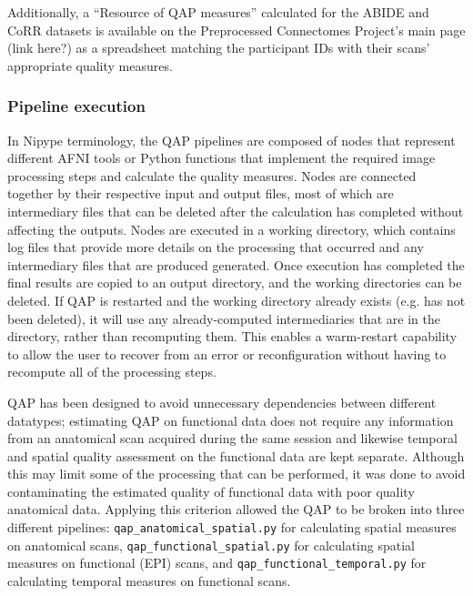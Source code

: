 
Additionally, a ``Resource of QAP measures'' calculated for the ABIDE and CoRR datasets is available on the Preprocessed Connectomes Project's main page (link here?) as a spreadsheet matching the participant IDs with their scans' appropriate quality measures. 



\subsubsection{Pipeline execution}

In Nipype terminology, the QAP pipelines are composed of nodes that represent different AFNI tools or Python functions that implement the required image processing steps and calculate the quality measures. Nodes are connected together by their respective input and output files, most of which are intermediary files that can be deleted after the calculation has completed without affecting the outputs. Nodes are executed in a working directory, which contains log files that provide more details on the processing that occurred and any intermediary files that are produced generated. Once execution has completed the final results are copied to an output directory, and the working directories can be deleted. If QAP is restarted and the working directory already exists (e.g. has not been deleted), it will use any already-computed intermediaries that are in the directory, rather than recomputing them. This enables a warm-restart capability to allow the user to recover from an error or reconfiguration without having to recompute all of the processing steps.

QAP has been designed to avoid unnecessary dependencies between different datatypes; estimating QAP on functional data does not require any information from an anatomical scan acquired during the same session and likewise temporal and spatial quality assessment on the functional data are kept separate. Although this may limit some of the processing that can be performed, it was done to avoid contaminating the estimated quality of functional data with poor quality anatomical data. Applying this criterion allowed the QAP to be broken into three different pipelines: \texttt{qap\_anatomical\_spatial.py} for calculating spatial measures on anatomical scans, \texttt{qap\_functional\_spatial.py} for calculating spatial measures on functional (EPI) scans, and \texttt{qap\_functional\_temporal.py} for calculating temporal measures on functional scans. 

